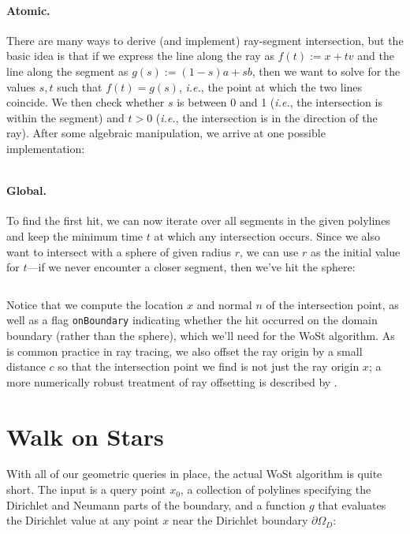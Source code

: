 \documentclass{article}
\newcommand{\code}[1]{\texttt{\small{#1}}}
\newcommand{\ie}{\emph{i.e.}} %
\renewcommand{\vec}[1]{#1}
\begin{document}
\paragraph{Atomic.} There are many ways to derive (and implement) ray-segment intersection, but the basic idea is that if we express the line along the ray as \(\vec{f}(t) := \vec{x} + t\vec{v}\) and the line along the segment as \(\vec{g}(s) := (1-s)\vec{a} + s\vec{b}\), then we want to solve for the values \(s,t\) such that \(\vec{f}(t) = \vec{g}(s)\), \ie, the point at which the two lines coincide.  We then check whether \(s\) is between 0 and 1 (\ie, the intersection is within the segment) and \(t > 0\) (\ie, the intersection is in the direction of the ray).  After some algebraic manipulation, we arrive at one possible implementation:

\inputminted[fontsize=\small,linenos,firstline=48,lastline=60,bgcolor=bg]{cpp}{../code/WoStLaplace2D.cpp}

\paragraph{Global.} To find the first hit, we can now iterate over all segments in the given polylines and keep the minimum time \(t\) at which any intersection occurs.  Since we also want to intersect with a sphere of given radius \(r\), we can use \(r\) as the initial value for \(t\)---if we never encounter a closer segment, then we've hit the sphere:

\inputminted[fontsize=\small,linenos,firstline=90,lastline=113,bgcolor=bg]{cpp}{../code/WoStLaplace2D.cpp}

Notice that we compute the location \(x\) and normal \(n\) of the intersection point, as well as a flag \code{onBoundary} indicating whether the hit occurred on the domain boundary (rather than the sphere), which we'll need for the WoSt algorithm.  As is common practice in ray tracing, we also offset the ray origin by a small distance \(c\) so that the intersection point we find is not just the ray origin \(x\); a more numerically robust treatment of ray offsetting is described by \citet{wachter2019fast}.

\section{Walk on Stars}
\label{sec:WalkOnStars}

With all of our geometric queries in place, the actual WoSt algorithm is quite short.  The input is a query point \(\vec{x}_0\), a collection of polylines specifying the Dirichlet and Neumann parts of the boundary, and a function \(g\) that evaluates the Dirichlet value at any point \(x\) near the Dirichlet boundary \(\partial\Omega_D\):
\end{document}
